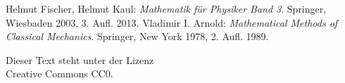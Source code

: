 \documentclass[a4paper,10pt,fleqn,twocolumn,twoside,dvipdfmx]{scrartcl}
\numberwithin{equation}{section}
\begin{document}
\begin{thebibliography}{00}
 Helmut Fischer, Helmut Kaul:
\emph{Mathematik für Physiker Band 3}. Springer, Wiesbaden 2003, 3. Aufl. 2013.
 Vladimir I. Arnold: \emph{Mathematical Methods of Classical
Mechanics}. Springer, New York 1978, 2. Aufl. 1989.
\end{thebibliography}

\vfill\noindent
Dieser Text steht unter der Lizenz\\
Creative Commons CC0.
\end{document}
